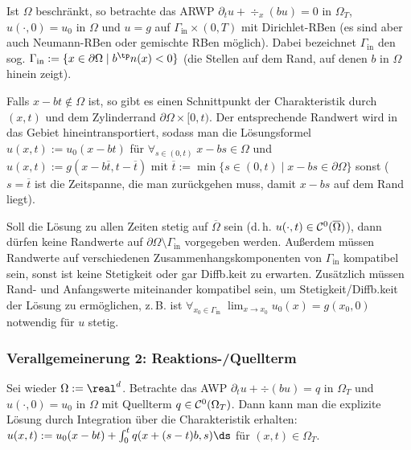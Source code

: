 \begin{Bem}
    Ist $\Omega$ beschränkt, so betrachte das ARWP
    $\partial_t u + \div_x(bu) = 0$ in $\Omega_T$,
    $u(\cdot, 0) = u_0$ in $\Omega$ und
    $u = g$ auf $\Gamma_\text{in} \times (0, T)$
    mit Dirichlet-RBen (es sind aber auch Neumann-RBen oder gemischte RBen möglich).
    Dabei bezeichnet $\Gamma_\text{in}$ den sog. 
    $\Gamma_\text{in} := \{x \in \partial\Omega \;|\; b^\tp n(x) < 0\}$
    (die Stellen auf dem Rand, auf denen $b$ in $\Omega$ hinein zeigt).

    Falls $x - bt \notin \Omega$ ist, so gibt es einen Schnittpunkt der Charakteristik durch
    $(x, t)$ und dem Zylinderrand $\partial\Omega \times [0, t)$.
    Der entsprechende Randwert wird in das Gebiet hineintransportiert, sodass man die Lösungsformel
    $u(x, t) := u_0(x - bt)$ für $\forall_{s \in (0, t)}\; x - bs \in \Omega$ und\\
    $u(x, t) := g(x - b\overline{t}, t - \overline{t})$ mit
    $\overline{t} := \min\{s \in (0, t) \;|\; x - bs \in \partial\Omega\}$ sonst
    ($s = \overline{t}$ ist die Zeitspanne, die man zurückgehen muss, damit $x - bs$ auf dem Rand
    liegt).

    Soll die Lösung zu allen Zeiten stetig auf $\overline{\Omega}$ sein
    (d.\,h. $u(\cdot, t) \in \mathcal{C}^0(\overline{\Omega})$), dann dürfen keine Randwerte auf
    $\partial\Omega \setminus \Gamma_\text{in}$ vorgegeben werden.
    Außerdem müssen Randwerte auf verschiedenen Zusammenhangskomponenten von $\Gamma_\text{in}$
    kompatibel sein, sonst ist keine Stetigkeit oder gar Diffb.keit zu erwarten.
    Zusätzlich müssen Rand- und Anfangswerte miteinander kompatibel sein, um Stetigkeit/Diffb.keit
    der Lösung zu ermöglichen, z.\,B. ist
    $\forall_{x_0 \in \Gamma_\text{in}}\; \lim_{x \to x_0} u_0(x) = g(x_0, 0)$
    notwendig für $u$ stetig.
\end{Bem}

\subsubsection{%
    Verallgemeinerung 2: Reaktions-/Quellterm%
}

\begin{Bem}
    Sei wieder $\Omega := \real^d$.
    Betrachte das AWP $\partial_t u + \div(bu) = q$ in $\Omega_T$ und $u(\cdot, 0) = u_0$ in
    $\Omega$ mit Quellterm $q \in \mathcal{C}^0(\Omega_T)$.
    Dann kann man die explizite Lösung durch Integration über die Charakteristik erhalten:
    $u(x, t) := u_0(x - bt) + \int_0^t q(x + (s-t)b, s)\ds$ für $(x, t) \in \Omega_T$.
\end{Bem}

